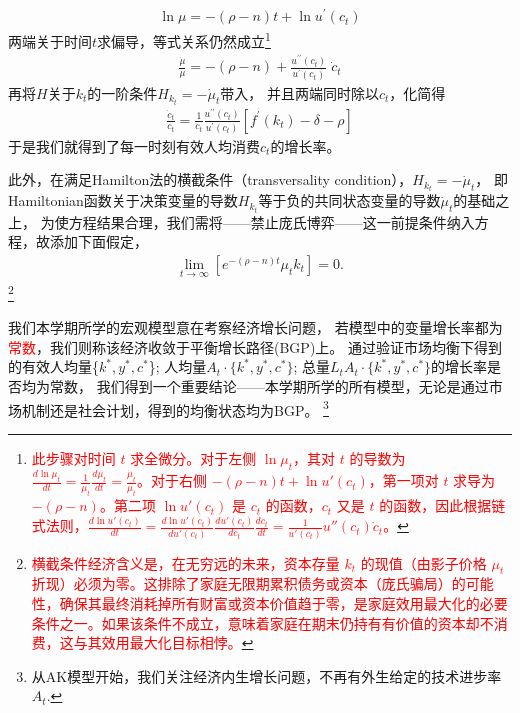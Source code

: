 \documentclass[cn,normal,11pt,black]{elegantnote}
\begin{document}
\begin{theorem}[Hamiltonian函数]
    \begin{align*}
        \ln \mu = -(\rho-n) t+\ln u^{\prime}(c_t)
    \end{align*}
    两端关于时间$t$求偏导，等式关系仍然成立\footnote{\textcolor{red}{此步骤对时间 $t$ 求全微分。对于左侧 $\ln \mu_t$，其对 $t$ 的导数为 $\frac{d \ln \mu_t}{dt} = \frac{1}{\mu_t} \frac{d\mu_t}{dt} = \frac{\dot{\mu}_t}{\mu_t}$。对于右侧 $-(\rho-n)t + \ln u'(c_t)$，第一项对 $t$ 求导为 $-(\rho-n)$。第二项 $\ln u'(c_t)$ 是 $c_t$ 的函数，$c_t$ 又是 $t$ 的函数，因此根据链式法则，$\frac{d \ln u'(c_t)}{dt} = \frac{d \ln u'(c_t)}{d u'(c_t)} \frac{d u'(c_t)}{d c_t} \frac{dc_t}{dt} = \frac{1}{u'(c_t)} u''(c_t) \dot{c}_t$。}}
    \begin{align*}
        \frac{\dot{\mu}}{\mu}= -(\rho-n)+\frac{u^{\prime \prime}(c_t)}{u^{\prime}(c_t)} \; \dot{c}_t
    \end{align*}
    再将$H$关于$k_t$的一阶条件$H_{k_t} = - \dot{\mu}_t$带入，
    并且两端同时除以$c_t$，化简得
    \begin{align*}
        \frac{\dot{c}_t}{c_t}= \frac{1}{c_t} \frac{u^{\prime \prime}(c_t)}{u^{\prime}(c_t)} \left[f^{\prime}(k_t)-\delta-\rho\right]
    \end{align*}
    于是我们就得到了每一时刻有效人均消费$c_t$的增长率。

    此外，在满足Hamilton法的横截条件（transversality condition），$H_{k_t} = - \dot{\mu}_t$，
    即Hamiltonian函数关于决策变量的导数$H_{k_t}$等于负的共同状态变量的导数$\dot{\mu}_t$的基础之上，
    为使方程结果合理，我们需将——禁止庞氏博弈——这一前提条件纳入方程，故添加下面假定，
    \begin{align*}
        \lim _{t \rightarrow \infty} \left[e^{-(\rho-n) t} \mu_t k_t \right] = 0 .
    \end{align*}\footnote{\textcolor{red}{横截条件经济含义是，在无穷远的未来，资本存量 $k_t$ 的现值（由影子价格 $\mu_t$ 折现）必须为零。这排除了家庭无限期累积债务或资本（庞氏骗局）的可能性，确保其最终消耗掉所有财富或资本价值趋于零，是家庭效用最大化的必要条件之一。如果该条件不成立，意味着家庭在期末仍持有有价值的资本却不消费，这与其效用最大化目标相悖。}}
\end{theorem}

\begin{definition}[平衡增长路径]  \label{defbgp}
    我们本学期所学的宏观模型意在考察经济增长问题，
    若模型中的变量增长率都为\textcolor{red}{常数}，我们则称该经济收敛于平衡增长路径(BGP)上。
    通过验证市场均衡下得到的有效人均量\{$k^*,y^*,c^*$\};
    人均量$A_t \cdot \{ k^*,y^*,c^* \}$;
    总量$L_t A_t \cdot \{k^*,y^*,c^* \}$的增长率是否均为常数，
    我们得到一个重要结论——本学期所学的所有模型，无论是通过市场机制还是社会计划，得到的均衡状态均为BGP。
    \footnote{从AK模型开始，我们关注经济内生增长问题，不再有外生给定的技术进步率$A_t$.}
\end{definition}    
\end{document}
